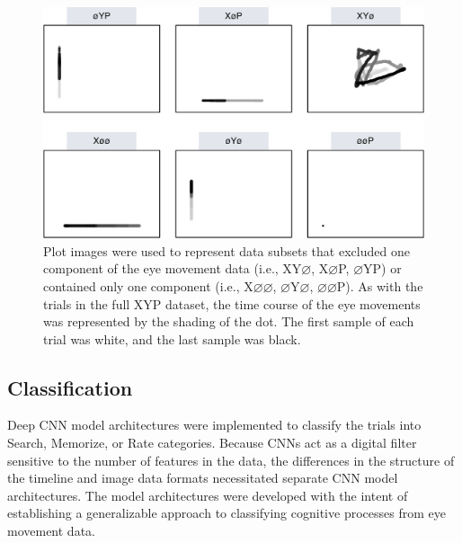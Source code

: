 \documentclass[
  english,
  man, donotrepeattitle,floatsintext]{apa6}
\begin{document}
\begin{figure}
\centering
\includegraphics{figures/subset_imgs.pdf}
\caption{\label{fig:ave-subset}Plot images were used to represent data subsets that excluded one component of the eye movement data (i.e., XY\(\varnothing\), X\(\varnothing\)P, \(\varnothing\)YP) or contained only one component (i.e., X\(\varnothing\varnothing\), \(\varnothing\)Y\(\varnothing\), \(\varnothing\varnothing\)P). As with the trials in the full XYP dataset, the time course of the eye movements was represented by the shading of the dot. The first sample of each trial was white, and the last sample was black.}
\end{figure}

\subsection{Classification}

Deep CNN model architectures were implemented to classify the trials into Search, Memorize, or Rate categories. Because CNNs act as a digital filter sensitive to the number of features in the data, the differences in the structure of the timeline and image data formats necessitated separate CNN model architectures. The model architectures were developed with the intent of establishing a generalizable approach to classifying cognitive processes from eye movement data.
\end{document}
